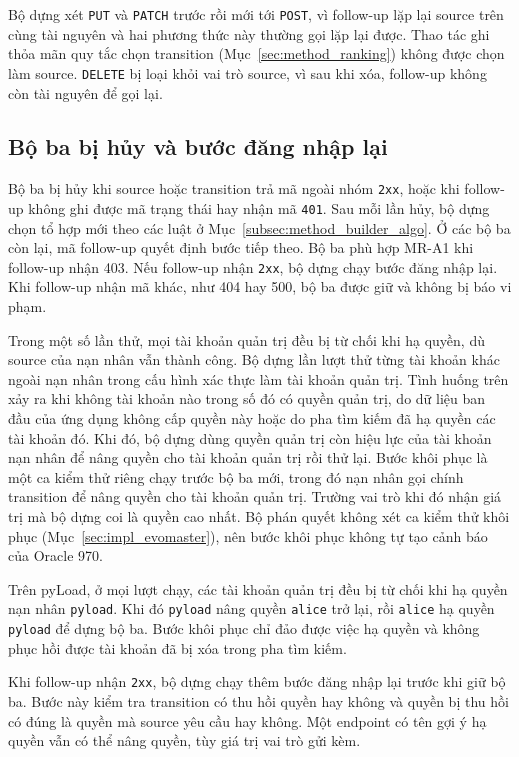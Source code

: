 Bộ dựng xét \texttt{PUT} và \texttt{PATCH} trước rồi mới tới \texttt{POST}, vì follow-up lặp lại source trên cùng tài nguyên và hai phương thức này thường gọi lặp lại được. Thao tác ghi thỏa mãn quy tắc chọn transition (Mục~\ref{sec:method_ranking}) không được chọn làm source. \texttt{DELETE} bị loại khỏi vai trò source, vì sau khi xóa, follow-up không còn tài nguyên để gọi lại.

\subsection{Bộ ba bị hủy và bước đăng nhập lại}
\label{subsec:method_void}

Bộ ba bị hủy khi source hoặc transition trả mã ngoài nhóm \texttt{2xx}, hoặc khi follow-up không ghi được mã trạng thái hay nhận mã \texttt{401}. Sau mỗi lần hủy, bộ dựng chọn tổ hợp mới theo các luật ở Mục~\ref{subsec:method_builder_algo}. Ở các bộ ba còn lại, mã follow-up quyết định bước tiếp theo. Bộ ba phù hợp MR-A1 khi follow-up nhận 403. Nếu follow-up nhận \texttt{2xx}, bộ dựng chạy bước đăng nhập lại. Khi follow-up nhận mã khác, như 404 hay 500, bộ ba được giữ và không bị báo vi phạm.

Trong một số lần thử, mọi tài khoản quản trị đều bị từ chối khi hạ quyền, dù source của nạn nhân vẫn thành công. Bộ dựng lần lượt thử từng tài khoản khác ngoài nạn nhân trong cấu hình xác thực làm tài khoản quản trị. Tình huống trên xảy ra khi không tài khoản nào trong số đó có quyền quản trị, do dữ liệu ban đầu của ứng dụng không cấp quyền này hoặc do pha tìm kiếm đã hạ quyền các tài khoản đó. Khi đó, bộ dựng dùng quyền quản trị còn hiệu lực của tài khoản nạn nhân để nâng quyền cho tài khoản quản trị rồi thử lại. Bước khôi phục là một ca kiểm thử riêng chạy trước bộ ba mới, trong đó nạn nhân gọi chính transition để nâng quyền cho tài khoản quản trị. Trường vai trò khi đó nhận giá trị mà bộ dựng coi là quyền cao nhất. Bộ phán quyết không xét ca kiểm thử khôi phục (Mục~\ref{sec:impl_evomaster}), nên bước khôi phục không tự tạo cảnh báo của Oracle 970.

Trên pyLoad, ở mọi lượt chạy, các tài khoản quản trị đều bị từ chối khi hạ quyền nạn nhân \texttt{pyload}. Khi đó \texttt{pyload} nâng quyền \texttt{alice} trở lại, rồi \texttt{alice} hạ quyền \texttt{pyload} để dựng bộ ba. Bước khôi phục chỉ đảo được việc hạ quyền và không phục hồi được tài khoản đã bị xóa trong pha tìm kiếm.

Khi follow-up nhận \texttt{2xx}, bộ dựng chạy thêm bước đăng nhập lại trước khi giữ bộ ba. Bước này kiểm tra transition có thu hồi quyền hay không và quyền bị thu hồi có đúng là quyền mà source yêu cầu hay không. Một endpoint có tên gợi ý hạ quyền vẫn có thể nâng quyền, tùy giá trị vai trò gửi kèm.

